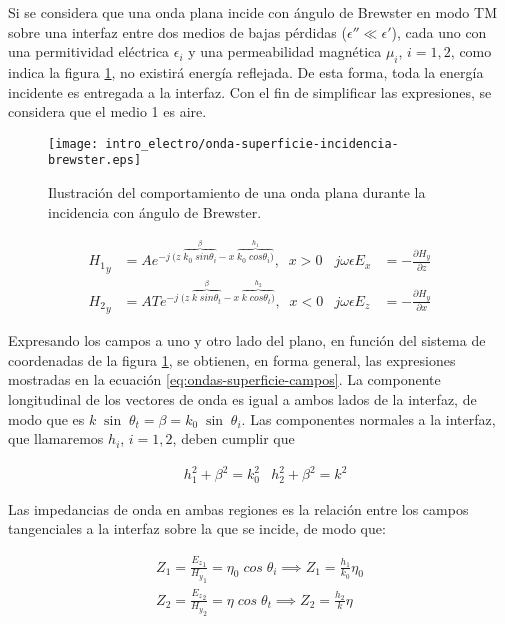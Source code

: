 Si se considera que una onda plana incide con ángulo de Brewster en modo TM sobre una interfaz entre dos medios de bajas pérdidas ($\epsilon'' \ll \epsilon'$), cada uno con una permitividad eléctrica $\epsilon_i$ y una permeabilidad magnética $\mu_i$, $i=1,2$, como indica la figura \ref{fig:onda-superficie-brewster}, no existirá energía reflejada. De esta forma, toda la energía incidente es entregada a la interfaz. Con el fin de simplificar las expresiones, se considera que el medio 1 es aire.

\begin{figure}[htp]
	\centering
	\texttt{[image: intro\_electro/onda-superficie-incidencia-brewster.eps]}
	\caption{Ilustración del comportamiento de una onda plana durante la incidencia con ángulo de Brewster.}
	\label{fig:onda-superficie-brewster}
\end{figure}

\begin{subequations}
	\label{eq:ondas-superficie-campos}
	\begin{align}
	{H_1}_y &= A e^{-j\ (z\; \overbrace{k_0\;sin \theta_i}^{\beta} - x\; \overbrace{k_0\;cos \theta_i)}^{h_1}},\;\; x>0 & j\omega\epsilon E_x &= -\frac{\partial H_y}{\partial z} \\
	{H_2}_y &= A T e^{-j\; (z\; \overbrace{k\; sin \theta_t}^{\beta} - x\; \overbrace{k\; cos \theta_t)}^{h_2}},\;\; x<0   & j\omega\epsilon E_z &= -\frac{\partial H_y}{\partial x} 
	\end{align}
\end{subequations}

Expresando los campos a uno y otro lado del plano, en función del sistema de coordenadas de la figura \ref{fig:onda-superficie-brewster}, se obtienen, en forma general, las expresiones mostradas en la ecuación \ref{eq:ondas-superficie-campos}. La componente longitudinal de los vectores de onda es igual a ambos lados de la interfaz, de modo que es $k \; \sin \; \theta_t = \beta = k_0 \; \sin \; \theta_i$. Las componentes normales a la interfaz, que llamaremos $h_i$, $i=1,2$, deben cumplir que

\begin{align}
& h_1^2 + \beta^2 = k_0^2 &h_2^2 + \beta^2 = k^2
\end{align}

Las impedancias de onda en ambas regiones es la relación entre los campos tangenciales a la interfaz sobre la que se incide, de modo que:

\begin{subequations}
\label{eq:impedancia-onda-superficie}
\begin{align}
	Z_1 = \frac{{E_z}_1}{{H_y}_1} = \eta_0 \; cos\; \theta_i \implies Z_1 = \frac{h_1}{k_0} \eta_0 \label{eq:impedancia-onda-incidente-onda-sup}\\
	Z_2 = \frac{{E_z}_2}{{H_y}_2} = \eta \; cos \; \theta_t \implies Z_2 = \frac{h_2}{k} \eta \label{eq:impedancia-onda-transmitida-onda-sup}
\end{align}
\end{subequations}

